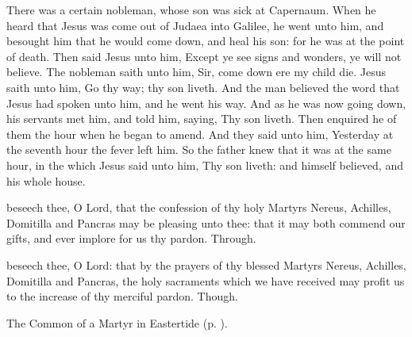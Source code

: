  There was a certain nobleman, whose son was sick at Capernaum. When he heard that Jesus was come out of Judaea into Galilee, he went unto him, and besought him that he would come down, and heal his son: for he was at the point of death. Then said Jesus unto him, Except ye see signs and wonders, ye will not believe. The nobleman saith unto him, Sir, come down ere my child die. Jesus saith unto him, Go thy way; thy son liveth. And the man believed the word that Jesus had spoken unto him, and he went his way. And as he was now going down, his servants met him, and told him, saying, Thy son liveth. Then enquired he of them the hour when he began to amend. And they said unto him, Yesterday at the seventh hour the fever left him. So the father knew that it was at the same hour, in the which Jesus said unto him, Thy son liveth: and himself believed, and his whole house.


\vspace{-0.15\baselineskip}

\secret

\vspace{-0.1\baselineskip}

 beseech thee, O Lord, that the confession of thy holy Martyrs Nereus, Achilles, Domitilla and Pancras may be pleasing unto thee: that it may both commend our gifts, and ever implore for us thy pardon. Through.


\vspace{-0.15\baselineskip}

\postcommunion

\vspace{-0.1\baselineskip}

 beseech thee, O Lord: that by the prayers of thy blessed Martyrs Nereus, Achilles, Domitilla and Pancras, the holy sacraments which we have received may profit us to the increase of thy merciful pardon. Though.



\begin{rubric}
	The Common of a Martyr in Eastertide (p. \pageref{CommonMartyrEaster}).
\end{rubric}

